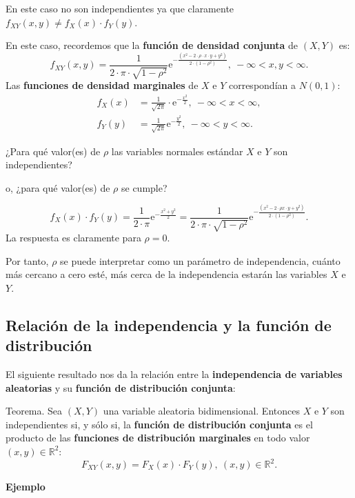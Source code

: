 \documentclass[
  letterpaper,
  DIV=11,
  numbers=noendperiod]{scrreprt}
\begin{document}
En este caso no son independientes ya que claramente
\(f_{XY}(x,y)\neq f_X(x)\cdot f_Y(y)\).

En este caso, recordemos que la \textbf{función de densidad conjunta} de
\((X,Y)\) es: \[
f_{XY}(x,y)=\frac{1}{2\cdot \pi\cdot \sqrt{1-\rho^2}}\mathrm{e}^{-\frac{(x^2-2\cdot \rho \cdot x\cdot y+y^2)}{2\cdot (1-\rho^2)}},\ -\infty <x,y<\infty.
\] Las \textbf{funciones de densidad marginales} de \(X\) e \(Y\)
correspondían a \(N(0,1)\): \[
\begin{array}{rl}
f_X(x) & =\frac{1}{\sqrt{2\pi}}\cdot \mathrm{e}^{-\frac{x^2}{2}},\ -\infty <x<\infty,\\ f_Y(y) & =\frac{1}{\sqrt{2\pi}}\mathrm{e}^{-\frac{y^2}{2}},\ -\infty <y<\infty.
\end{array}
\]

¿Para qué valor(es) de \(\rho\) las variables normales estándar \(X\) e
\(Y\) son independientes?

o, ¿para qué valor(es) de \(\rho\) se cumple?

\[
f_X(x)\cdot f_Y(y)=\frac{1}{2\cdot\pi}\mathrm{e}^{-\frac{x^2+y^2}{2}} = \frac{1}{2\cdot\pi\cdot\sqrt{1-\rho^2}}\mathrm{e}^{-\frac{(x^2-2\cdot\rho x \cdot y+y^2)}{2\cdot (1-\rho^2)}}.
\] La respuesta es claramente para \(\rho=0\).

Por tanto, \(\rho\) se puede interpretar como un parámetro de
independencia, cuánto más cercano a cero esté, más cerca de la
independencia estarán las variables \(X\) e \(Y\).

\hypertarget{relaciuxf3n-de-la-independencia-y-la-funciuxf3n-de-distribuciuxf3n}{%
\subsection{Relación de la independencia y la función de
distribución}\label{relaciuxf3n-de-la-independencia-y-la-funciuxf3n-de-distribuciuxf3n}}

El siguiente resultado nos da la relación entre la \textbf{independencia
de variables aleatorias} y su \textbf{función de distribución conjunta}:

Teorema. Sea \((X,Y)\) una variable aleatoria bidimensional. Entonces
\(X\) e \(Y\) son independientes si, y sólo si, la \textbf{función de
distribución conjunta} es el producto de las \textbf{funciones de
distribución marginales} en todo valor \((x,y)\in\mathbb{R}^2\): \[
F_{XY}(x,y)=F_X(x)\cdot F_Y(y),\ (x,y)\in\mathbb{R}^2.
\]

\textbf{Ejemplo}
\end{document}

